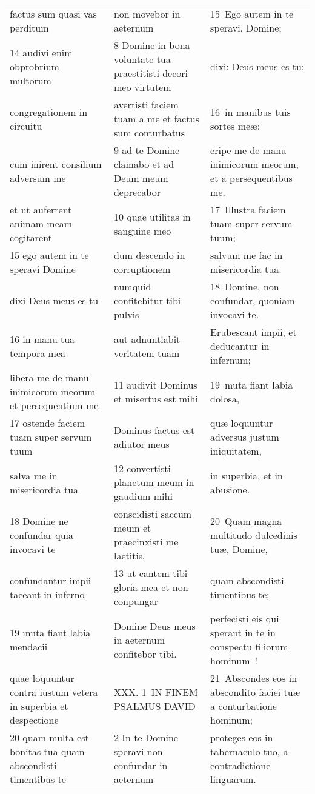 \documentclass{article}
\begin{document}
\begin{longtable}{@{}p{}p{}p{}@{}}
factus sum quasi vas perditum	&	non movebor in aeternum	&	15 Ego autem in te speravi, Domine;	\\
14 audivi enim obprobrium multorum	&	8 Domine in bona voluntate tua praestitisti decori meo virtutem	&	dixi: Deus meus es tu;	\\
congregationem in circuitu	&	avertisti faciem tuam a me et factus sum conturbatus	&	16 in manibus tuis sortes meæ:	\\
cum inirent consilium adversum me	&	9 ad te Domine clamabo et ad Deum meum deprecabor	&	eripe me de manu inimicorum meorum, et a persequentibus me.	\\
et ut auferrent animam meam cogitarent	&	10 quae utilitas in sanguine meo	&	17 Illustra faciem tuam super servum tuum;	\\
15 ego autem in te speravi Domine	&	dum descendo in corruptionem	&	salvum me fac in misericordia tua.	\\
dixi Deus meus es tu	&	numquid confitebitur tibi pulvis	&	18 Domine, non confundar, quoniam invocavi te.	\\
16 in manu tua tempora mea	&	aut adnuntiabit veritatem tuam	&	Erubescant impii, et deducantur in infernum;	\\
libera me de manu inimicorum meorum et persequentium me	&	11 audivit Dominus et misertus est mihi	&	19 muta fiant labia dolosa,	\\
17 ostende faciem tuam super servum tuum	&	Dominus factus est adiutor meus	&	quæ loquuntur adversus justum iniquitatem,	\\
salva me in misericordia tua	&	12 convertisti planctum meum in gaudium mihi	&	in superbia, et in abusione.	\\
18 Domine ne confundar quia invocavi te	&	conscidisti saccum meum et praecinxisti me laetitia	&	20 Quam magna multitudo dulcedinis tuæ, Domine,	\\
confundantur impii taceant in inferno	&	13 ut cantem tibi gloria mea et non conpungar	&	quam abscondisti timentibus te;	\\
19 muta fiant labia mendacii	&	Domine Deus meus in aeternum confitebor tibi.	&	perfecisti eis qui sperant in te in conspectu filiorum hominum !	\\
quae loquuntur contra iustum vetera in superbia et despectione	&	XXX. 1 IN FINEM PSALMUS DAVID	&	21 Abscondes eos in abscondito faciei tuæ a conturbatione hominum;	\\
20 quam multa est bonitas tua quam abscondisti timentibus te	&	2 In te Domine speravi non confundar in aeternum	&	proteges eos in tabernaculo tuo, a contradictione linguarum.	\\

\end{longtable}
\end{document}

